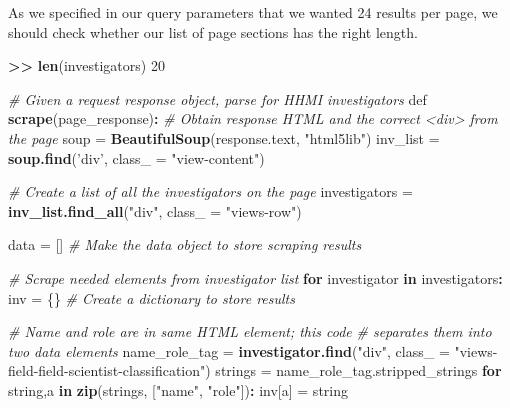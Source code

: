 \documentclass[]{krantz}
\newenvironment{Shaded}{\begin{snugshade}}{\end{snugshade}}
\newcommand{\KeywordTok}[1]{\textcolor[rgb]{0.13,0.29,0.53}{\textbf{#1}}}
\newcommand{\DataTypeTok}[1]{\textcolor[rgb]{0.13,0.29,0.53}{#1}}
\newcommand{\DecValTok}[1]{\textcolor[rgb]{0.00,0.00,0.81}{#1}}
\newcommand{\StringTok}[1]{\textcolor[rgb]{0.31,0.60,0.02}{#1}}
\newcommand{\CommentTok}[1]{\textcolor[rgb]{0.56,0.35,0.01}{\textit{#1}}}
\newcommand{\ControlFlowTok}[1]{\textcolor[rgb]{0.13,0.29,0.53}{\textbf{#1}}}
\newcommand{\OperatorTok}[1]{\textcolor[rgb]{0.81,0.36,0.00}{\textbf{#1}}}
\newcommand{\ErrorTok}[1]{\textcolor[rgb]{0.64,0.00,0.00}{\textbf{#1}}}
\newcommand{\NormalTok}[1]{#1}
\begin{document}
As we specified in our query parameters that we wanted 24 results per
page, we should check whether our list of page sections has the right
length.

\begin{Shaded}
\begin{Highlighting}[]
\OperatorTok{>}\ErrorTok{>}\StringTok{ }\KeywordTok{len}\NormalTok{(investigators)}
\DecValTok{20}
\end{Highlighting}
\end{Shaded}

\begin{Shaded}
\begin{Highlighting}[]
\CommentTok{# Given a request response object, parse for HHMI investigators}
\NormalTok{def }\KeywordTok{scrape}\NormalTok{(page_response)}\OperatorTok{:}
\StringTok{   }\CommentTok{# Obtain response HTML and the correct <div> from the page}
\StringTok{   }\NormalTok{soup =}\StringTok{ }\KeywordTok{BeautifulSoup}\NormalTok{(response.text, }\StringTok{"html5lib"}\NormalTok{)}
\NormalTok{   inv_list =}\StringTok{ }\KeywordTok{soup.find}\NormalTok{(}\StringTok{'div'}\NormalTok{, }\DataTypeTok{class_ =} \StringTok{"view-content"}\NormalTok{)}

   \CommentTok{# Create a list of all the investigators on the page}
\NormalTok{   investigators =}\StringTok{ }\KeywordTok{inv_list.find_all}\NormalTok{(}\StringTok{"div"}\NormalTok{, }\DataTypeTok{class_ =} \StringTok{"views-row"}\NormalTok{)}

\NormalTok{   data =}\StringTok{ }\NormalTok{[] }\CommentTok{# Make the data object to store scraping results}

   \CommentTok{# Scrape needed elements from investigator list}
   \ControlFlowTok{for}\NormalTok{ investigator }\ControlFlowTok{in}\NormalTok{ investigators}\OperatorTok{:}
\StringTok{       }\NormalTok{inv =}\StringTok{ }\NormalTok{\{\} }\CommentTok{# Create a dictionary to store results}

       \CommentTok{# Name and role are in same HTML element; this code}
       \CommentTok{# separates them into two data elements}
\NormalTok{       name_role_tag =}\StringTok{ }\KeywordTok{investigator.find}\NormalTok{(}\StringTok{"div"}\NormalTok{,}
           \DataTypeTok{class_ =} \StringTok{"views-field-field-scientist-classification"}\NormalTok{)}
\NormalTok{       strings =}\StringTok{ }\NormalTok{name_role_tag.stripped_strings}
       \ControlFlowTok{for}\NormalTok{ string,a }\ControlFlowTok{in} \KeywordTok{zip}\NormalTok{(strings, [}\StringTok{"name"}\NormalTok{, }\StringTok{"role"}\NormalTok{])}\OperatorTok{:}
\StringTok{           }\NormalTok{inv[a] =}\StringTok{ }\NormalTok{string}


\end{Highlighting}
\end{Shaded}
\end{document}
